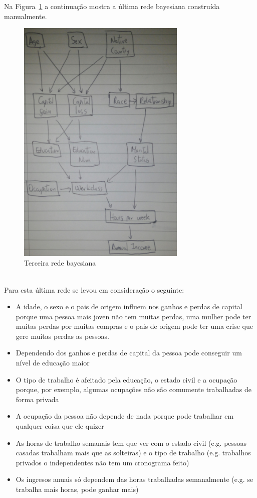 	Na Figura~\ref{fig:rede3} a continuação mostra a última rede bayesiana construída manualmente.
	\begin{figure}[ht]
		\centering
		\includegraphics[height=12cm]{images/rede3}
		\caption{Terceira rede bayesiana}
		\label{fig:rede3}
	\end{figure}
	\\
	Para esta última rede se levou em consideração o seguinte:
	\begin{itemize}
		\item A idade, o sexo e o pais de origem influem nos ganhos e perdas de capital porque uma pessoa mais joven não tem muitas perdas, uma mulher pode ter muitas perdas por muitas compras e o pais de origem pode ter uma crise que gere muitas perdas as pessoas.
		\item Dependendo dos ganhos e perdas de capital da pessoa pode conseguir um nível de educação maior
		\item O tipo de trabalho é afeitado pela educação, o estado civil e a ocupação porque, por exemplo, algumas ocupações não são comumente trabalhadas de forma privada
		\item A ocupação da pessoa não depende de nada porque pode trabalhar em qualquer coisa que ele quizer
		\item As horas de trabalho semanais tem que ver com o estado civil (e.g. pessoas casadas trabalham mais que as solteiras) e o tipo de trabalho (e.g. trabalhos privados o independentes não tem um cronograma feito)
		\item Os ingresos anuais só dependem das horas trabalhadas semanalmente (e.g. se trabalha mais horas, pode ganhar mais)
	\end{itemize}
	
\clearpage